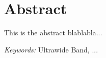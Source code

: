 % 			 
%
%

\chapter*{Abstract}

This is the abstract blablabla...

\textit{Keywords:} Ultrawide Band, ...